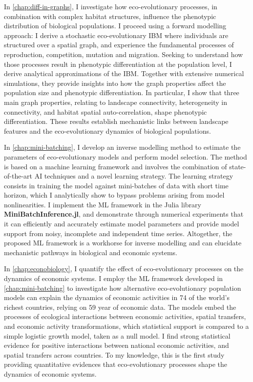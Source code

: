 In \cref{chap:diff-in-graphs}, I investigate how eco-evolutionary processes, in combination with complex habitat structures, influence the phenotypic distribution of biological populations. 
I proceed using a forward modelling approach: I derive a stochastic eco-evolutionary IBM where individuals are structured over a spatial graph, and experience the fundamental processes of reproduction, competition, mutation and migration. Seeking to understand how those processes result in phenotypic differentiation at the population level, I derive analytical approximations of the IBM. Together with extensive numerical simulations, they provide insights into how the graph properties affect the population size and phenotypic differentiation. In particular, I show that three main graph properties, relating to landscape connectivity, heterogeneity in connectivity, and habitat spatial auto-correlation, shape phenotypic differentiation. These results establish mechanistic links between landscape features and the eco-evolutionary dynamics of biological populations.

In \cref{chap:mini-batching}, I develop an inverse modelling method to estimate the parameters of eco-evolutionary models and perform model selection. The method is based on a machine learning framework and involves the combination of state-of-the-art AI techniques and a novel learning strategy. The learning strategy consists in training the model against mini-batches of data with short time horizon, which I analytically show to bypass problems arising from model nonlinearities. I implement the ML framework in the Julia library \textbf{MiniBatchInference.jl}, and demonstrate through numerical experiments that it can efficiently and accurately estimate model parameters and provide model support from noisy, incomplete and independent time series. Altogether, the proposed ML framework is a workhorse for inverse modelling and can elucidate mechanistic pathways in biological and economic systems.

In \cref{chap:econobiology}, I quantify the effect of eco-evolutionary processes on the dynamics of economic systems. I employ the ML framework developed in \cref{chap:mini-batching} to investigate how alternative eco-evolutionary population models can explain the dynamics of economic activities in 74 of the world's richest countries, relying on 59 year of economic data. The models embed the processes of ecological interactions between economic activities, spatial transfers, and economic activity transformations, which statistical support is compared to a simple logistic growth model, taken as a null model. I find strong statistical evidence for positive interactions between national economic activities, and spatial transfers across countries. To my knowledge, this is the first study providing quantitative evidences that eco-evolutionary processes shape the dynamics of economic systems.

